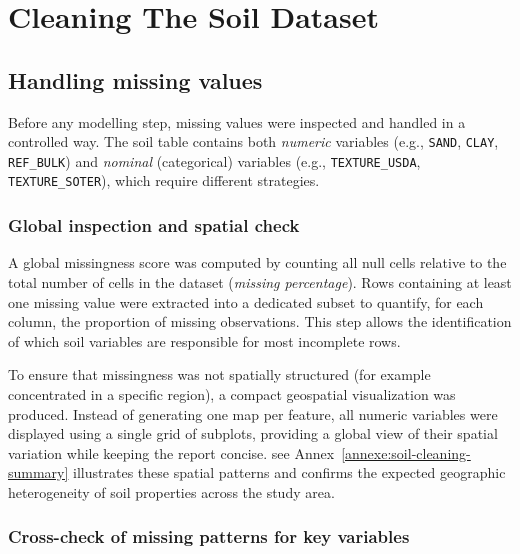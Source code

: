 \ifdefined\pdfstringdefDisableCommands
\fi

\section{Cleaning The Soil Dataset}

\subsection{Handling missing values}

Before any modelling step, missing values were inspected and handled in a controlled way.
The soil table contains both \textit{numeric} variables (e.g., \texttt{SAND}, \texttt{CLAY}, \texttt{REF\_BULK}) and \textit{nominal} (categorical) variables (e.g., \texttt{TEXTURE\_USDA}, \texttt{TEXTURE\_SOTER}), which require different strategies.

\subsubsection{Global inspection and spatial check}

A global missingness score was computed by counting all null cells relative to the total number of cells in the dataset (\textit{missing percentage}).
Rows containing at least one missing value were extracted into a dedicated subset to quantify, for each column, the proportion of missing observations.
This step allows the identification of which soil variables are responsible for most incomplete rows.

To ensure that missingness was not spatially structured (for example concentrated in a specific region), a compact geospatial visualization was produced.
Instead of generating one map per feature, all numeric variables were displayed using a single grid of subplots, providing a global view of their spatial variation while keeping the report concise.
see Annex~\ref{annexe:soil-cleaning-summary} illustrates these spatial patterns and confirms the expected geographic heterogeneity of soil properties across the study area.

\subsubsection{Cross-check of missing patterns for key variables}

